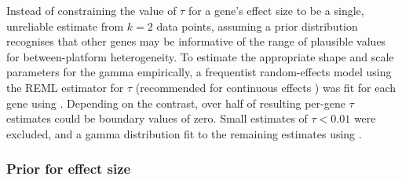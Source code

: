 Instead of constraining the value of $\tau$ for a gene's effect size to be a single, unreliable estimate from $k=2$ data points,
assuming a prior distribution recognises that other genes may be informative of the range of plausible values for between-platform heterogeneity.
To estimate the appropriate shape and scale parameters for the gamma empirically, 
a frequentist random-effects model using the \gls{REML} estimator for $\tau$ (recommended for continuous effects \autocite{veroniki2016MethodsEstimateBetweenstudy}) was fit for each gene using  \autocite{viechtbauer2010ConductingMetaAnalysesMetafor}.
Depending on the contrast, over half of resulting per-gene $\tau$ estimates could be boundary values of zero.
Small estimates of $\tau < 0.01$ were excluded, and a gamma distribution fit to the remaining estimates using  \autocite{delignette-muller2015FitdistrplusPackageFitting}.

\subsubsection{Prior for effect size}

